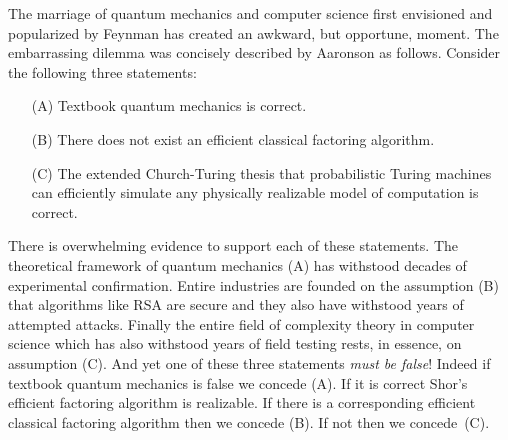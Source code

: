 \documentclass{article}
\theoremstyle{remark}
\begin{document}
The marriage of quantum mechanics and computer science first
envisioned and popularized by Feynman has created an awkward, but
opportune, moment. The embarrassing dilemma was concisely described by
Aaronson as follows. Consider the following three statements:
\begin{enumerate}
\item[(A)] Textbook quantum mechanics is correct.
\item[(B)] There does not exist an efficient classical factoring
  algorithm.
\item[(C)] The extended Church-Turing thesis that probabilistic Turing
  machines can efficiently simulate any physically realizable model of
  computation is correct.
\end{enumerate}
There is overwhelming evidence to support each of these
statements. The theoretical framework of quantum mechanics (A) has
withstood decades of experimental confirmation. Entire industries are
founded on the assumption (B) that algorithms like RSA are secure and
they also have withstood years of attempted attacks. Finally the
entire field of complexity theory in computer science which has also
withstood years of field testing rests, in essence, on assumption
(C). And yet one of these three statements \emph{must be false}! Indeed
if textbook quantum mechanics is false we concede (A). If it is
correct Shor's efficient factoring algorithm is realizable. If there
is a corresponding efficient classical factoring algorithm then we
concede (B). If not then we concede~(C).
\end{document}
